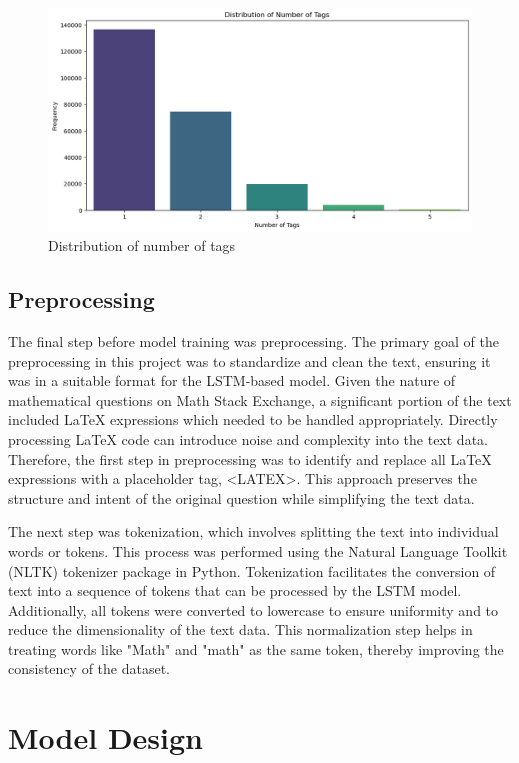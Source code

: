 \documentclass[12pt, letterpaper]{article}
\begin{document}
\begin{figure}[H]
\centering
\includegraphics[scale=0.6]{../figs/exploratory_analysis/tag_number_distribution}
\caption{Distribution of number of tags}
\end{figure}
\subsection{Preprocessing}
The final step before model training was preprocessing. The primary goal of the preprocessing in this project was to standardize and clean the text, ensuring it was in a suitable format for the LSTM-based model. Given the nature of mathematical questions on Math Stack Exchange, a significant portion of the text included LaTeX expressions which needed to be handled appropriately. Directly processing LaTeX code can introduce noise and complexity into the text data. Therefore, the first step in preprocessing was to identify and replace all LaTeX expressions with a placeholder tag, <LATEX>. This approach preserves the structure and intent of the original question while simplifying the text data. 
\par The next step was tokenization, which involves splitting the text into individual words or tokens. This process was performed using the Natural Language Toolkit (NLTK) tokenizer package in Python. Tokenization facilitates the conversion of text into a sequence of tokens that can be processed by the LSTM model. Additionally, all tokens were converted to lowercase to ensure uniformity and to reduce the dimensionality of the text data. This normalization step helps in treating words like "Math" and "math" as the same token, thereby improving the consistency of the dataset.



\section{Model Design}
\end{document}
